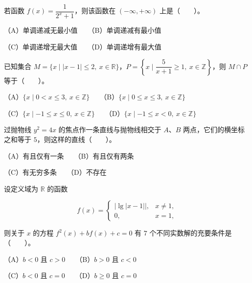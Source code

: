 \begin{question}
若函数 $f(x)=\dfrac{1}{2^x+1}$，则该函数在 $(-\infty,+\infty)$ 上是\mbox{（　　）}。

（A）单调递减无最小值　　（B）单调递减有最小值

（C）单调递增无最大值　　（D）单调递增有最大值

\end{question}
\begin{question}
已知集合 $M=\{x\mid |x-1|\leqslant2,\ x\in\mathbb R\}$，$P=\left\{x\mid\dfrac{5}{x+1}\geqslant1,\ x\in\mathbb Z\right\}$，则 $M\cap P$ 等于\mbox{（　　）}。

（A）$\{x\mid 0<x\leqslant3,\ x\in\mathbb Z\}$　　（B）$\{x\mid 0\leqslant x\leqslant3,\ x\in\mathbb Z\}$

（C）$\{x\mid -1\leqslant x\leqslant0,\ x\in\mathbb Z\}$　　（D）$\{x\mid -1\leqslant x<0,\ x\in\mathbb Z\}$

\end{question}
\begin{question}
过抛物线 $y^2=4x$ 的焦点作一条直线与抛物线相交于 $A$、$B$ 两点，它们的横坐标之和等于 $5$，则这样的直线\mbox{（　　）}。

（A）有且仅有一条　　（B）有且仅有两条

（C）有无穷多条　　（D）不存在

\end{question}
\begin{question}
设定义域为 $\mathbb R$ 的函数

\nopagebreak[4]
\[
f(x)=
\begin{cases}
|\lg|x-1||, & x\ne1,\\
0, & x=1,
\end{cases}
\]

则关于 $x$ 的方程 $f^2(x)+bf(x)+c=0$ 有 $7$ 个不同实数解的充要条件是\mbox{（　　）}。

（A）$b<0$ 且 $c>0$　　（B）$b>0$ 且 $c<0$

（C）$b<0$ 且 $c=0$　　（D）$b\geqslant0$ 且 $c=0$

\end{question}

